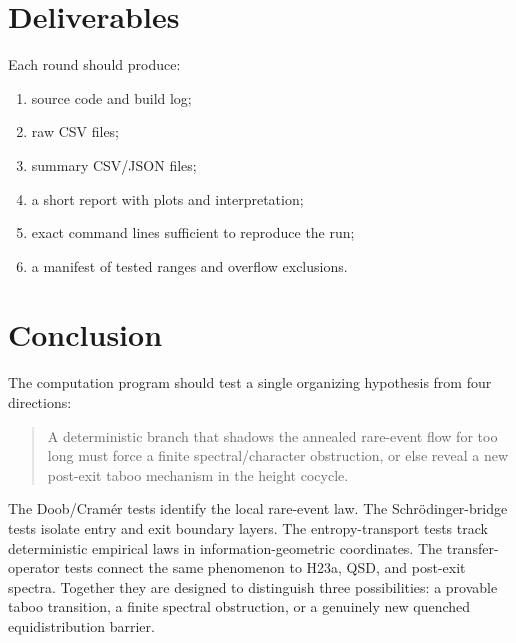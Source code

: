 \documentclass[11pt]{article}
\begin{document}
\section{Deliverables}

Each round should produce:
\begin{enumerate}
  \item source code and build log;
  \item raw CSV files;
  \item summary CSV/JSON files;
  \item a short report with plots and interpretation;
  \item exact command lines sufficient to reproduce the run;
  \item a manifest of tested ranges and overflow exclusions.
\end{enumerate}

\section{Conclusion}

The computation program should test a single organizing hypothesis from four directions:
\begin{quote}
A deterministic branch that shadows the annealed rare-event flow for too long must force a finite spectral/character obstruction, or else reveal a new post-exit taboo mechanism in the height cocycle.
\end{quote}
The Doob/Cram\'er tests identify the local rare-event law. The Schr\"odinger-bridge tests isolate entry and exit boundary layers. The entropy-transport tests track deterministic empirical laws in information-geometric coordinates. The transfer-operator tests connect the same phenomenon to H23a, QSD, and post-exit spectra. Together they are designed to distinguish three possibilities: a provable taboo transition, a finite spectral obstruction, or a genuinely new quenched equidistribution barrier.
\end{document}
